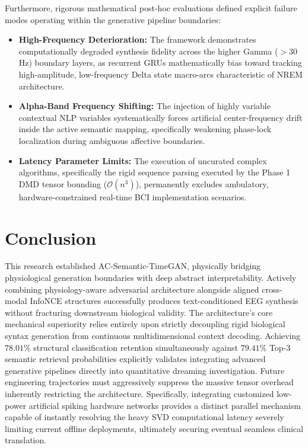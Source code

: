 \documentclass[journal]{IEEEtran}
\begin{document}
Furthermore, rigorous mathematical post-hoc evaluations defined explicit failure modes operating within the generative pipeline boundaries:
\begin{itemize}
    \item \textbf{High-Frequency Deterioration:} The framework demonstrates computationally degraded synthesis fidelity across the higher Gamma ($>30$Hz) boundary layers, as recurrent GRUs mathematically bias toward tracking high-amplitude, low-frequency Delta state macro-arcs characteristic of NREM architecture.
    \item \textbf{Alpha-Band Frequency Shifting:} The injection of highly variable contextual NLP variables systematically forces artificial center-frequency drift inside the active semantic mapping, specifically weakening phase-lock localization during ambiguous affective boundaries.
    \item \textbf{Latency Parameter Limits:} The execution of uncurated complex algorithms, specifically the rigid sequence parsing executed by the Phase 1 DMD tensor bounding ($\mathcal{O}(n^3)$), permanently excludes ambulatory, hardware-constrained real-time BCI implementation scenarios.
\end{itemize}

\section{Conclusion}

This research established AC-Semantic-TimeGAN, physically bridging physiological generation boundaries with deep abstract interpretability. Actively combining physiology-aware adversarial architecture alongside aligned cross-modal InfoNCE structures successfully produces text-conditioned EEG synthesis without fracturing downstream biological validity. The architecture's core mechanical superiority relies entirely upon strictly decoupling rigid biological syntax generation from continuous multidimensional context decoding. Achieving $78.01\%$ structural classification retention simultaneously against $79.41\%$ Top-3 semantic retrieval probabilities explicitly validates integrating advanced generative pipelines directly into quantitative dreaming investigation. Future engineering trajectories must aggressively suppress the massive tensor overhead inherently restricting the architecture. Specifically, integrating customized low-power artificial spiking hardware networks provides a distinct parallel mechanism capable of instantly resolving the heavy SVD computational latency severely limiting current offline deployments, ultimately securing eventual seamless clinical translation.



\end{document}
